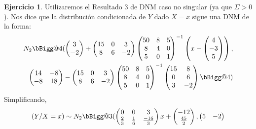\documentclass[12pt,spanish]{article}
\makeatletter
\newcommand{\vast}{\bBigg@{3}}
\newcommand{\Vast}{\bBigg@{4}}
\theoremstyle{definition}
\newtheorem{exercise}{Ejercicio}
\makeatother
\begin{document}
\begin{exercise} %
  Utilizaremos el Resultado 3 de DNM caso no singular (ya que
  $\Sigma>0$). Nos dice que la distribución condicionada de $Y$ dado
  $X=x$ sigue una DNM de la forma:
  \begin{align*}
    N_2\Vast(
      \begin{pmatrix}
        3 \\ -2
      \end{pmatrix}
+
\begin{pmatrix}
  15 & 0 & 3 \\
  8 & 6 & -2
\end{pmatrix}
\begin{pmatrix}
  50 & 8 & 5 \\
  8 & 4 & 0 \\
  5 & 0 & 1
\end{pmatrix}^{-1}\left(x-
  \begin{pmatrix}
    4 \\ -3 \\ 5
  \end{pmatrix}
\right), \\
\begin{pmatrix}
  14 & -8 \\
  -8 & 18 
\end{pmatrix}-\begin{pmatrix}
  15 & 0 & 3 \\
  8 & 6 & -2
\end{pmatrix}\begin{pmatrix}
  50 & 8 & 5 \\
  8 & 4 & 0 \\
  5 & 0 & 1
\end{pmatrix}^{-1}
\begin{pmatrix}
  15 & 8 \\
  0 & 6 \\
  3 & -2
\end{pmatrix}\Vast)
  \end{align*}
  Simplificando, \[(Y/X=x)\sim N_2\vast(
      \begin{pmatrix}
        0 & 0 & 3 \\
        \frac{2}{3} & \frac{1}{6} & \frac{-16}{3}
      \end{pmatrix}x+
      \begin{pmatrix}
        -12 \\ \frac{45}{2}
      \end{pmatrix},
      \begin{pmatrix}
        5 & -2 \\

\end{pmatrix}\]
\end{exercise}
\end{document}
